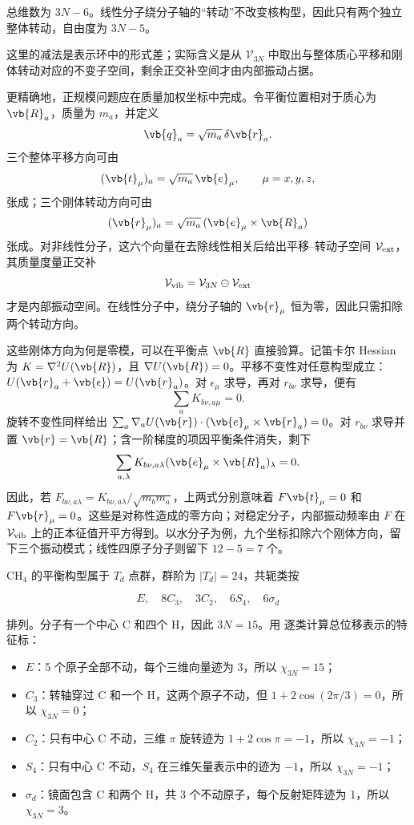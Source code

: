 总维数为 \(3N-6\)。线性分子绕分子轴的“转动”不改变核构型，因此只有两个独立整体转动，自由度为 \(3N-5\)。

这里的减法是表示环中的形式差；实际含义是从 \(\mathcal V_{3N}\) 中取出与整体质心平移和刚体转动对应的不变子空间，剩余正交补空间才由内部振动占据。

更精确地，正规模问题应在质量加权坐标中完成。令平衡位置相对于质心为 \(\vb{R}_a\)，质量为 \(m_a\)，并定义
\[
\vb{q}_a=\sqrt{m_a}\,\delta\vb{r}_a.
\]
三个整体平移方向可由
\[
(\vb{t}_\mu)_a=\sqrt{m_a}\,\vb{e}_\mu,
\qquad \mu=x,y,z,
\]
张成；三个刚体转动方向可由
\[
(\vb{r}_\mu)_a=\sqrt{m_a}\,(\vb{e}_\mu\times\vb{R}_a)
\]
张成。对非线性分子，这六个向量在去除线性相关后给出平移--转动子空间 \(\mathcal V_{\rm ext}\)，其质量度量正交补
\[
\mathcal V_{\rm vib}=\mathcal V_{3N}\ominus\mathcal V_{\rm ext}
\]
才是内部振动空间。在线性分子中，绕分子轴的 \(\vb{r}_\mu\) 恒为零，因此只需扣除两个转动方向。

这些刚体方向为何是零模，可以在平衡点 \(\vb{R}\) 直接验算。记笛卡尔 Hessian 为 \(K=\nabla^2U(\vb{R})\)，且 \(\nabla U(\vb{R})=0\)。平移不变性对任意构型成立：\(U(\vb{r}_a+\vb{\epsilon})=U(\vb{r}_a)\)。对 \(\epsilon_\mu\) 求导，再对 \(r_{b\nu}\) 求导，便有
\[
\sum_a K_{b\nu,a\mu}=0.
\]
旋转不变性同样给出 \(\sum_a\nabla_a U(\vb{r})\cdot(\vb{e}_\mu\times\vb{r}_a)=0\)。对 \(r_{b\nu}\) 求导并置 \(\vb{r}=\vb{R}\)；含一阶梯度的项因平衡条件消失，剩下
\[
\sum_{a,\lambda}K_{b\nu,a\lambda}
(\vb{e}_\mu\times\vb{R}_a)_\lambda=0.
\]
因此，若 \(F_{b\nu,a\lambda}=K_{b\nu,a\lambda}/\sqrt{m_bm_a}\)，上两式分别意味着 \(F\vb{t}_\mu=0\) 和 \(F\vb{r}_\mu=0\)。这些是对称性造成的零方向；对稳定分子，内部振动频率由 \(F\) 在 \(\mathcal V_{\rm vib}\) 上的正本征值开平方得到。以水分子为例，九个坐标扣除六个刚体方向，留下三个振动模式；线性四原子分子则留下 \(12-5=7\) 个。

CH\(_4\) 的平衡构型属于 \(T_d\) 点群，群阶为 \(|T_d|=24\)，共轭类按

\[
E,
\quad 8C_3,
\quad 3C_2,
\quad 6S_4,
\quad 6\sigma_d
\]

排列。分子有一个中心 C 和四个 H，因此 \(3N=15\)。用  逐类计算总位移表示的特征标：

\begin{itemize}
\item \(E\)：5 个原子全部不动，每个三维向量迹为 3，所以 \(\chi_{3N}=15\)；
\item \(C_3\)：转轴穿过 C 和一个 H，这两个原子不动，但 \(1+2\cos(2\pi/3)=0\)，所以 \(\chi_{3N}=0\)；
\item \(C_2\)：只有中心 C 不动，三维 \(\pi\) 旋转迹为 \(1+2\cos\pi=-1\)，所以 \(\chi_{3N}=-1\)；
\item \(S_4\)：只有中心 C 不动，\(S_4\) 在三维矢量表示中的迹为 \(-1\)，所以 \(\chi_{3N}=-1\)；
\item \(\sigma_d\)：镜面包含 C 和两个 H，共 3 个不动原子，每个反射矩阵迹为 1，所以 \(\chi_{3N}=3\)。
\end{itemize}

